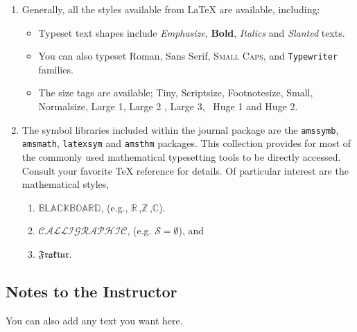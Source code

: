 \begin{enumerate}
\item Generally, all the styles available from \LaTeX{} are available, including:
\begin{itemize}
    \item Typeset text shapes include \emph{Emphasize}, \textbf{Bold},
\textit{Italics} and \textsl{Slanted} texts.
\item You can also typeset \textrm{Roman}, \textsf{Sans Serif}, \textsc{Small Caps}, and
\texttt{Typewriter} families.
\item The size tags are available;  {\tiny Tiny},
{\scriptsize Scriptsize}, {\footnotesize Footnotesize}, {\small Small}, {\normalsize
Normalsize}, {\large Large 1}, {\Large Large 2 }, {\LARGE Large 3}, \ {\huge Huge 1} and {\Huge
Huge 2}.

\end{itemize}

\item The symbol libraries included within the journal package are the
\texttt{amssymb}, \texttt{amsmath}, \texttt{latexsym} and \texttt{amsthm} packages.
This collection provides for most of the commonly used mathematical typesetting tools to be
directly accessed. Consult your favorite \TeX{} reference for details.   Of particular interest
are the mathematical styles,
\begin{enumerate}
\item $\mathbb{BLACKBOARD}$, (e.g., $\mathbb{R}\,$,$\mathbb{Z}\,$,$\mathbb{C}$).
\item $\mathcal{CALLIGRAPHIC}$, (e.g. $\mathcal{S}= \emptyset$), and
\item $\mathfrak{Fraktur}$.
\end{enumerate}



\end{enumerate}


\backmatter

\begin{annotation}
\chapter{Notes to the Instructor}

\renewcommand\notesname{}
\vspace{-2cm}
\begingroup
\setlength{\parskip}{2ex}
\renewcommand{\enotesize}{\normalsize}
\theendnotes
\endgroup
\end{annotation}

\vspace{.1in}

You can also add any text you want here.



